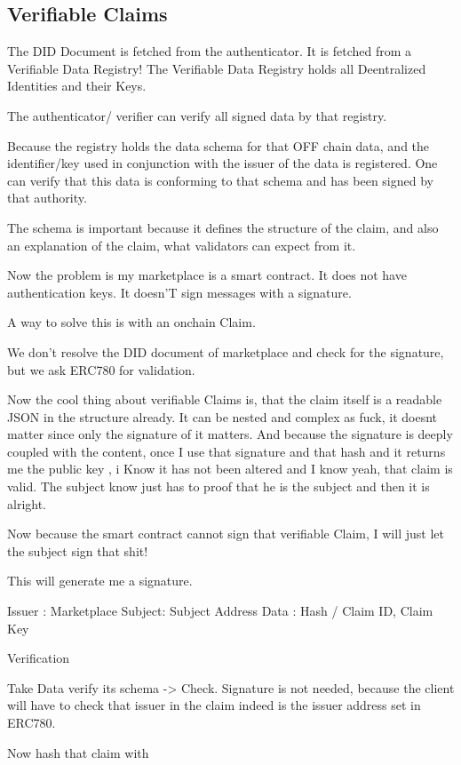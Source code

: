 \subsection{Verifiable Claims}
The DID Document is fetched  from the authenticator. It is fetched from a Verifiable Data Registry! The  Verifiable Data Registry holds all Deentralized Identities and their Keys. 

The authenticator/ verifier can verify all signed data by that registry. 

Because the registry holds the data schema for that OFF chain data, and the identifier/key used in conjunction with the issuer of the data is registered. One can verify that this data is conforming to that schema and has been signed by that authority. 

The schema is important because it defines the structure of the claim, and also an explanation of the claim, what validators can expect from it. 


Now the problem is my marketplace is a smart contract. It does not have authentication keys. It doesn'T sign messages with a signature. 

A way to solve this is with an onchain Claim. 

We don't resolve the DID document of marketplace and check for the signature, but we ask ERC780 for validation. 

Now the cool thing about verifiable Claims is, that the claim itself is a readable JSON in the structure already. It can be nested and complex as fuck, it doesnt matter since only the signature of it matters. And because the signature is deeply coupled with the content, once I use that signature and that hash and it returns me the public key , i Know it has not been altered and I know yeah, that claim is valid. The subject know just has to proof that he is the subject and then it is alright. 

Now because the smart contract cannot sign that verifiable Claim, I will just let the subject sign that shit! 

This will generate me a signature. 

Issuer  : Marketplace 
Subject: Subject Address
Data : Hash  / Claim ID, Claim Key  

Verification 

Take Data verify its schema -> Check. 
Signature is not needed, because the client will have to check that issuer in the claim indeed is the issuer address set in ERC780. 

Now hash that claim with 